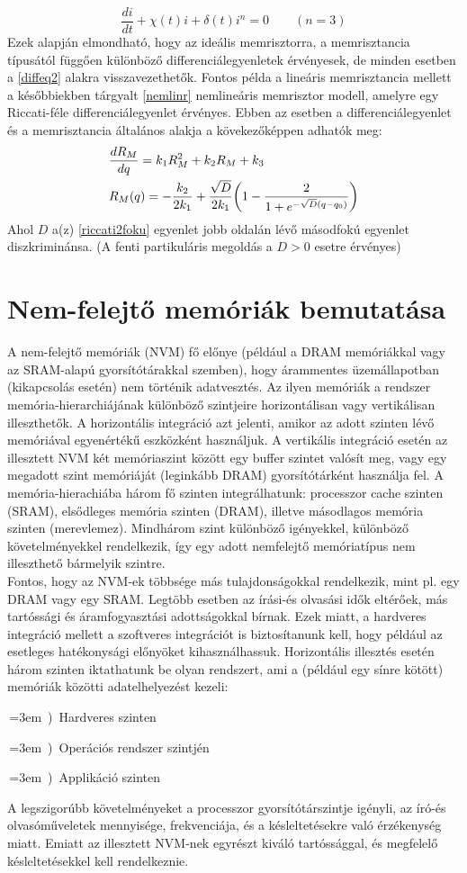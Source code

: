 \documentclass[twoside]{article}
\newcounter{itemnum}
\newenvironment{anumerate}[1][]
{\setcounter{itemnum}{0}
 \smallskip
\def\elem{\stepcounter{itemnum}\par\,\hangindent=3em\hangafter=1\noindent\;#1\ \alph{itemnum})\ }}
{\par\medskip}
\begin{document}
 \begin{equation}
 	\frac{di}{dt} + \chi(t)i + \delta(t)i^n = 0\qquad(n = 3)
 \end{equation}
 Ezek alapján elmondható, hogy az ideális memrisztorra, a memrisztancia típusától függően különböző differenciálegyenletek érvényesek, de minden esetben a \eqref{diffeq2} alakra visszavezethetők. Fontos példa a lineáris memrisztancia mellett a későbbiekben tárgyalt \eqref{nemlinr} nemlineáris memrisztor modell, amelyre egy Riccati-féle differenciálegyenlet érvényes.\cite{biolek2015} Ebben az esetben a differenciálegyenlet és a memrisztancia általános alakja a kövekezőképpen adhatók meg:
 \begin{align}
 &\frac{dR_M}{dq} = k_1R^2_M + k_2R_M + k_3 \label{riccati2foku}\\
 &R_M(q) = -\frac{k_2}{2k_1} + \frac{\sqrt{D}}{2k_1}\mleft(1-\frac{2}{1 + e^{-\sqrt{D}(q-q_0)}}\mright)
 \end{align}
 Ahol $D$ a(z) \eqref{riccati2foku} egyenlet jobb oldalán lévő másodfokú egyenlet diszkriminánsa. (A fenti partikuláris megoldás a $D>0$ esetre érvényes)

\section{Nem-felejtő memóriák bemutatása}
A nem-felejtő memóriák (NVM) fő előnye (például a DRAM memóriákkal vagy az SRAM-alapú gyorsítótárakkal szemben), hogy árammentes üzemállapotban (kikapcsolás esetén) nem történik adatvesztés. Az ilyen memóriák a rendszer memória-hierarchiájának különböző szintjeire horizontálisan vagy vertikálisan illeszthetők. A horizontális integráció azt jelenti, amikor az adott szinten lévő memóriával egyenértékű eszközként használjuk. A vertikális integráció esetén az illesztett NVM két memóriaszint között egy buffer szintet valósít meg, vagy egy megadott szint memóriáját (leginkább DRAM) gyorsítótárként használja fel. A memória-hierachiába három fő szinten integrálhatunk: processzor cache szinten (SRAM), elsődleges memória szinten (DRAM), illetve másodlagos memória szinten (merevlemez). Mindhárom szint különböző igényekkel, különböző követelményekkel rendelkezik, így egy adott nemfelejtő memóriatípus nem illeszthető bármelyik szintre. \\
Fontos, hogy az NVM-ek többsége más tulajdonságokkal rendelkezik, mint pl. egy DRAM vagy egy SRAM. Legtöbb esetben az írási-és olvasási idők eltérőek, más tartóssági és áramfogyasztási adottságokkal bírnak. Ezek miatt, a hardveres integráció mellett a szoftveres integrációt is biztosítanunk kell, hogy például az esetleges hatékonysági előnyöket kihasználhassuk. Horizontális illesztés esetén három szinten iktathatunk be olyan rendszert, ami a (például egy sínre kötött) memóriák közötti adatelhelyezést kezeli: \begin{anumerate}
	\elem Hardveres szinten
	\elem Operációs rendszer szintjén
	\elem  Applikáció szinten
\end{anumerate}
A legszigorúbb követelményeket a processzor gyorsítótárszintje igényli, az író-és olvasóműveletek mennyisége, frekvenciája, és a késleltetésekre való érzékenység miatt. Emiatt az illesztett NVM-nek egyrészt kiváló tartóssággal, és megfelelő késleltetésekkel kell rendelkeznie.
\end{document}
